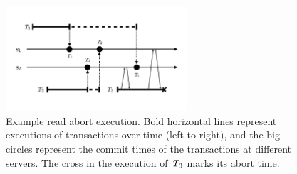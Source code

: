 \begin{figure}[t]
  \centering
  \vspace{-1cm}
  \includegraphics[width=0.6\textwidth]{figures/ch4_abort_execution.pdf}
  \vspace{-0.5cm}
\caption{Example read abort execution. Bold horizontal lines represent executions of transactions over time (left to right), and the big circles represent the commit times of the transactions at different servers. The cross in the execution of $\mathit{T}_3$ marks its abort time. }
\label{fig:read_abort}
\end{figure}
